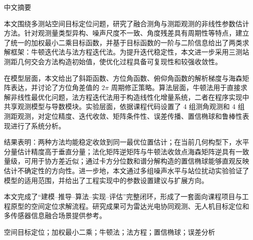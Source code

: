 \thispagestyle{plain}
{}
\centerline{\heiti 中文摘要}

\linespread{1.4}\bigskip

本文围绕多测站空间目标定位问题，研究了融合测角与测距观测的非线性参数估计方法。针对观测量类型异构、噪声尺度不一致、角度残差具有周期性等特点，建立了统一的加权最小二乘目标函数，并基于目标函数的一阶与二阶信息给出了两类求解框架：牛顿迭代法与法方程迭代法。为提升迭代稳定性，本文进一步采用三测站测距几何交会方法构造初始值，使优化过程具备可复现性和较强收敛性。

在模型层面，本文给出了斜距函数、方位角函数、俯仰角函数的解析梯度与海森矩阵表达，并讨论了方位角差值的 $2\pi$ 周期修正策略。算法层面，牛顿法用于直接求解非线性最优化问题，法方程迭代法用于构造线性化增量系统，二者在程序实现中共享观测模型与导数模块。实验层面，依据课程代码设置了 4 组测角观测和 4 组测距观测，对定位精度、迭代收敛、矩阵条件性、误差传播、置信椭球和鲁棒性表现进行了系统分析。

结果表明：两种方法均能稳定收敛到同一最优位置估计；在当前几何构型下，水平分量估计精度高于垂直分量；法化矩阵逆矩阵与牛顿法收敛点海森矩阵逆具有一致量级，可用于协方差近似；通过卡方分位数和谱分解构造的置信椭球能够直观反映估计不确定性的方向性。进一步地，本文通过多组噪声水平与站位扰动实验验证了模型的适用范围，并给出了工程实现中的参数设置建议与扩展方向。

本文完成了“建模--推导--算法--实现--评估”完整闭环，形成了一套面向课程项目与工程原型的空间定位求解流程。研究成果可为雷达光电协同观测、无人机目标定位和多传感器信息融合场景提供参考。

\bigskip
{}
空间目标定位；加权最小二乘；牛顿法；法方程；置信椭球；误差分析
